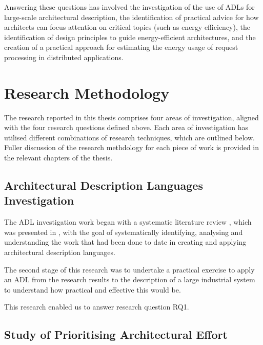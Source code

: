 Answering these questions has involved the investigation of the use of ADLs for large-scale architectural description, the identification of practical advice for how architects can focus attention on critical topics (such as energy efficiency), the identification of design principles to guide energy-efficient architectures, and the creation of a practical approach for estimating the energy usage of request processing in distributed applications.

\section{Research Methodology}

The research reported in this thesis comprises four areas of investigation, aligned with the four research questions defined above.  Each area of investigation has utilised different combinations of research techniques, which are outlined below.  Fuller discussion of the research methdology for each piece of work is provided in the relevant chapters of the thesis.

\subsection{Architectural Description Languages Investigation}

The ADL investigation work began with a systematic literature review \cite{kitchenham2007-slr}, which was presented in , with the goal of systematically identifying, analysing and understanding the work that had been done to date in creating and applying architectural description languages.  

The second stage of this research was to undertake a practical exercise to apply an ADL from the research results to the description of a large industrial system to understand how practical and effective this would be.

This research enabled us to answer research question RQ1.

\subsection{Study of Prioritising Architectural Effort}


